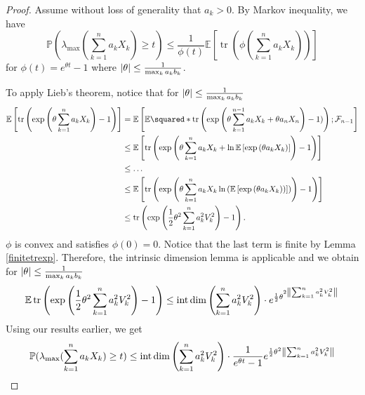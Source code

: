 \begin{proof}
    Assume without loss of generality that \( a_k >0 \).
    By Markov inequality, we have 
    \[ \mathbb{P}(\lambda_{\text{max}} (\sum_{k=1}^{n}a_kX_k) \geq t) \leq \frac{1}{\phi(t)} \mathbb{E}\left[\operatorname{tr}\left(\phi(\sum_{k=1}^{n}a_kX_k)\right)\right] \]
    for \( \phi(t) = e^{\theta t}-1\) where \( \abs{\theta} \leq \frac{1}{\max_{k} a_kb_k} \).  

    To apply Lieb's theorem, notice that for \( \abs{\theta} \leq \frac{1}{\max_{k}a_kb_k} \)
    \begin{align*}
      \mathbb{E}\left[\operatorname{tr}\left(\operatorname{exp}\left(\theta \sum_{k=1}^{n}a_k X_k\right)-1\right)\right] &= \mathbb{E}\left[ \mathbb{E}\squared*{\operatorname{tr}\left(\operatorname{exp}\left(\theta \sum_{k=1}^{n-1}a_kX_k+\theta a_nX_n\right)-1)\right);\mathcal{F}_{n-1}}\right] \\
                                                                                                                      & \leq \mathbb{E}\left[\operatorname{tr}\left(\operatorname{exp}\left(\theta \sum_{k=1}^{n}a_kX_k+ \operatorname{ln} \mathbb{E}\left[\operatorname{exp}\left(\theta a_kX_k\right)\right]\right)-1\right)\right] \\
                      & \leq \dots \\
                      & \leq \mathbb{E}\left[\operatorname{tr}\left(\operatorname{exp}\left(\theta \sum_{k=1}^{n} a_kX_k\operatorname{ln}\left(\mathbb{E}\left[\operatorname{exp}\left(\theta a_k X_k)\right)\right]\right)\right)-1\right)\right] \\
                      & \leq \operatorname{tr}\left(\operatorname{exp}\left(\frac{1}{2}\theta^{2}\sum_{k=1}^{n}a_k^{2}V_k^{2}\right)-1\right).
    \end{align*}
    \( \phi \) is convex and satisfies \( \phi(0)=0 \). Notice that the last term is finite by Lemma \ref{finitetrexp}. Therefore, the intrinsic dimension lemma is applicable and we obtain for \( \abs{\theta} \leq \frac{1}{\max_{k}a_kb_k} \)
    \[ \mathbb{E}\operatorname{tr}\left(\operatorname{exp}\left(\frac{1}{2}\theta^{2}\sum_{k=1}^{n}a_k^{2}V_k^{2}\right)-1\right)\leq \operatorname{int\, dim}\left(\sum_{k=1}^{n}a_k^{2}V_k^{2}\right) \cdot e^{\frac{1}{2} \theta^{2 \norm{\sum_{k=1}^{n}a_k^{2}V_k^{2}}_{}}} \] 
    Using our results earlier, we get
    \[ \mathbb{P}(\lambda_{\text{max}} (\sum_{k=1}^{n}a_kX_k) \geq t) \leq \operatorname{int\, dim}\left(\sum_{k=1}^{n}a_k^{2}V_k^{2}\right) \cdot \frac{1}{e^{\theta t}-1} e^{\frac{1}{2}\theta^{2}\norm{\sum_{k=1}^{n}a_k^{2}V_k^{2}}_{}} \]

\end{proof}
